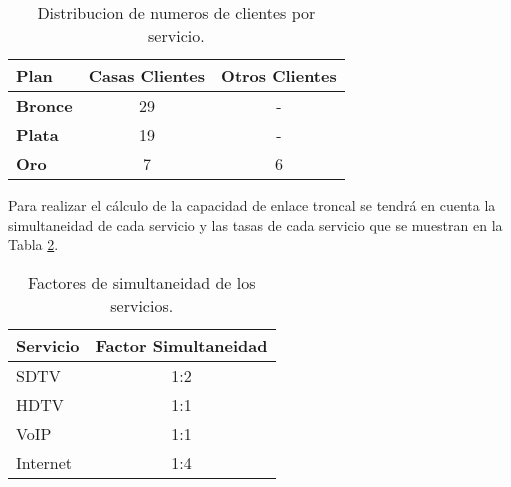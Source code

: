 \begin{table}[H]
  \centering
    \begin{tabular}{|l|c|c|}
    \hline
    \rowcolor[HTML]{C5D9F1} \textbf{Plan} & \multicolumn{1}{l|}{\textbf{Casas Clientes}} & \multicolumn{1}{l|}{\textbf{Otros Clientes}} \bigstrut\\
    \hline
    \rowcolor[HTML]{C5D9F1} \textbf{Bronce} & \cellcolor[rgb]{ 1,  1,  1}29 & \cellcolor[rgb]{ 1,  1,  1}- \bigstrut\\
    \hline
    \rowcolor[HTML]{C5D9F1} \textbf{Plata} & \cellcolor[rgb]{ 1,  1,  1}19 & \cellcolor[rgb]{ 1,  1,  1}- \bigstrut\\
    \hline
    \rowcolor[HTML]{C5D9F1} \textbf{Oro} & \cellcolor[rgb]{ 1,  1,  1}7 & \cellcolor[rgb]{ 1,  1,  1}6 \bigstrut\\
    \hline
    \end{tabular}%
  \caption{Distribucion de numeros de clientes por servicio.}
  \label{tab:num-clientes}%
\end{table}%





Para realizar el cálculo de la capacidad de enlace troncal se tendrá en cuenta la simultaneidad de cada servicio y las tasas de cada servicio que se muestran en la Tabla \ref{tab:factores-simultaneidad}.
\begin{table}[H]
  \centering
    \begin{tabular}{|l|c|}
    \hline
    \rowcolor[HTML]{C5D9F1} \textbf{Servicio} & \multicolumn{1}{l|}{\textbf{Factor Simultaneidad}} \bigstrut\\
    \hline
    SDTV & 1:2 \bigstrut\\
    \hline
    HDTV & 1:1 \bigstrut\\
    \hline
    VoIP & 1:1 \bigstrut\\
    \hline
    Internet & 1:4 \bigstrut\\
    \hline
    \end{tabular}%
  \caption{Factores de simultaneidad de los servicios.}
  \label{tab:factores-simultaneidad}%
\end{table}%

